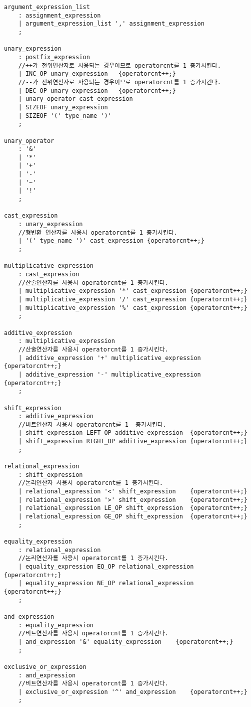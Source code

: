 \documentclass{article}
\begin{document}
\begin{verbatim}
argument_expression_list
	: assignment_expression
	| argument_expression_list ',' assignment_expression
	;

unary_expression
	: postfix_expression
	//++가 전위연산자로 사용되는 경우이므로 operatorcnt를 1 증가시킨다.
	| INC_OP unary_expression	{operatorcnt++;}
	//--가 전위연산자로 사용되는 경우이므로 operatorcnt를 1 증가시킨다.
	| DEC_OP unary_expression	{operatorcnt++;}	
	| unary_operator cast_expression
	| SIZEOF unary_expression
	| SIZEOF '(' type_name ')'
	;

unary_operator
	: '&'	
	| '*'	
	| '+'	
	| '-'	
	| '~'	
	| '!'	
	;

cast_expression
	: unary_expression
	//형변환 연산자를 사용시 operatorcnt를 1 증가시킨다.
	| '(' type_name ')' cast_expression	{operatorcnt++;}
	;

multiplicative_expression
	: cast_expression	
	//산술연산자를 사용시 operatorcnt를 1 증가시킨다.
	| multiplicative_expression '*' cast_expression	{operatorcnt++;}	
	| multiplicative_expression '/' cast_expression	{operatorcnt++;}
	| multiplicative_expression '%' cast_expression	{operatorcnt++;}
	;

additive_expression
	: multiplicative_expression
	//산술연산자를 사용시 operatorcnt를 1 증가시킨다.
	| additive_expression '+' multiplicative_expression	{operatorcnt++;}
	| additive_expression '-' multiplicative_expression	{operatorcnt++;}
	;

shift_expression
	: additive_expression
	//비트연산자 사용시 operatorcnt를 1	증가시킨다.
	| shift_expression LEFT_OP additive_expression	{operatorcnt++;}
	| shift_expression RIGHT_OP additive_expression	{operatorcnt++;}
	;

relational_expression
	: shift_expression
	//논리연산자 사용시 operatorcnt를 1 증가시킨다.
	| relational_expression '<' shift_expression	{operatorcnt++;}
	| relational_expression '>' shift_expression	{operatorcnt++;}
	| relational_expression LE_OP shift_expression	{operatorcnt++;}
	| relational_expression GE_OP shift_expression	{operatorcnt++;}
	;	

equality_expression
	: relational_expression
	//논리연산자를 사용시 operatorcnt를 1 증가시킨다.
	| equality_expression EQ_OP relational_expression	{operatorcnt++;}
	| equality_expression NE_OP relational_expression	{operatorcnt++;}
	;

and_expression
	: equality_expression
	//비트연산자를 사용시 operatorcnt를 1 증가시킨다.
	| and_expression '&' equality_expression	{operatorcnt++;}
	;

exclusive_or_expression
	: and_expression
	//비트연산자를 사용시 operatorcnt를 1 증가시킨다.
	| exclusive_or_expression '^' and_expression	{operatorcnt++;}
	;


\end{verbatim}
\end{document}
